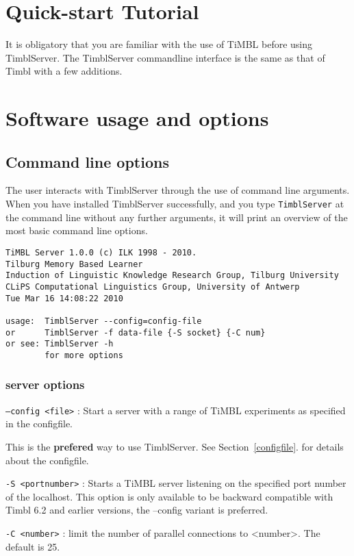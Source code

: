 \documentclass{report}
\begin{document}
\chapter{Quick-start Tutorial}
\label{tutorial}

It is obligatory that you are familiar with the use of TiMBL before using TimblServer. The TimblServer commandline interface is the same as that of Timbl with a few additions.


\chapter{Software usage and options}
\label{reference}

\section{Command line options}
\label{commandline}

The user interacts with TimblServer through the use of command line arguments.
When you have installed TimblServer successfully, and you type {\tt TimblServer}
at the command line without any further arguments, it will print an overview
of the most basic command line options. 

{\footnotesize
\begin{verbatim}
TiMBL Server 1.0.0 (c) ILK 1998 - 2010.
Tilburg Memory Based Learner
Induction of Linguistic Knowledge Research Group, Tilburg University
CLiPS Computational Linguistics Group, University of Antwerp
Tue Mar 16 14:08:22 2010

usage:  TimblServer --config=config-file
or      TimblServer -f data-file {-S socket} {-C num}
or see: TimblServer -h
        for more options
\end{verbatim}
}

\subsection{server options}

\begin{description}

\item {\tt --config <file>} : Start a server with a range of TiMBL experiments as specified in the configfile.

This is the {\bf prefered} way to use TimblServer. See Section~\ref{configfile}. for details about the configfile.

\item {\tt -S <portnumber>} : Starts a TiMBL server listening on the
  specified port number of the localhost. 
This option is only available to be backward compatible with Timbl 6.2 and earlier versions, the --config variant is preferred.
\item {\tt -C <number>} : limit the number of parallel connections to <number>. The default is 25.

\end{description}
\end{document}
